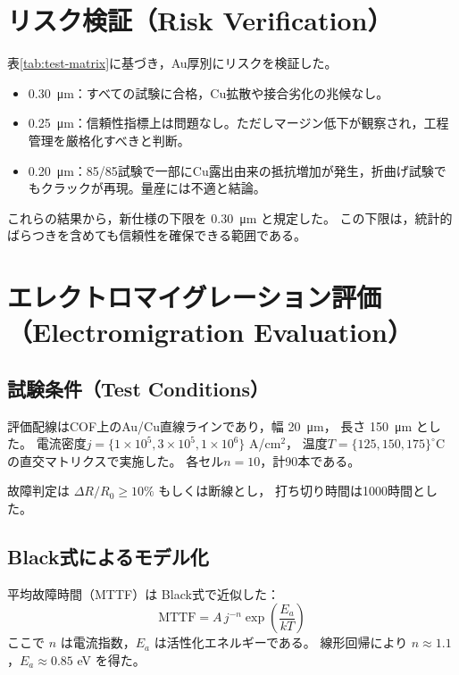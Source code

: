 \documentclass[conference]{IEEEtran}
\begin{document}
\section{リスク検証（Risk Verification）}
表\ref{tab:test-matrix}に基づき，Au厚別にリスクを検証した。
\begin{itemize}
  \item \SI{0.30}{\micro\meter}：すべての試験に合格，Cu拡散や接合劣化の兆候なし。
  \item \SI{0.25}{\micro\meter}：信頼性指標上は問題なし。ただしマージン低下が観察され，工程管理を厳格化すべきと判断。
  \item \SI{0.20}{\micro\meter}：85/85試験で一部にCu露出由来の抵抗増加が発生，折曲げ試験でもクラックが再現。量産には不適と結論。
\end{itemize}

これらの結果から，新仕様の下限を \SI{0.30}{\micro\meter} と規定した。
この下限は，統計的ばらつきを含めても信頼性を確保できる範囲である。

\section{エレクトロマイグレーション評価（Electromigration Evaluation）}

\subsection{試験条件（Test Conditions）}
評価配線はCOF上のAu/Cu直線ラインであり，幅 \SI{20}{\micro\meter}，
長さ \SI{150}{\micro\meter} とした。
電流密度$j=\{1\times10^5, 3\times10^5, 1\times10^6\}$ A/cm$^2$，
温度$T=\{125,150,175\}^\circ$C の直交マトリクスで実施した。
各セル$n=10$，計90本である。

故障判定は $\Delta R/R_0 \geq 10\%$ もしくは断線とし，
打ち切り時間は1000時間とした。

\subsection{Black式によるモデル化}
平均故障時間（MTTF）は Black式で近似した：
\begin{equation}
  \mathrm{MTTF} = A \, j^{-n} \exp\!\left(\frac{E_a}{kT}\right)
  \label{eq:black}
\end{equation}
ここで $n$ は電流指数，$E_a$ は活性化エネルギーである。
線形回帰により $n \approx 1.1$，$E_a \approx 0.85$ eV を得た。
\end{document}
